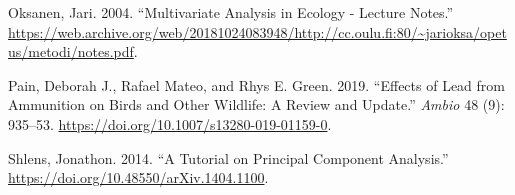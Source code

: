 \documentclass[
  letterpaper,
  DIV=11,
  numbers=noendperiod]{scrreprt}
\newlength{\cslhangindent}
\newenvironment{CSLReferences}[2] %
 {\begin{list}{}{%
  \setlength{\itemindent}{0pt}
  \setlength{\leftmargin}{0pt}
  \setlength{\parsep}{0pt}
  \ifodd #1
   \setlength{\leftmargin}{\cslhangindent}
   \setlength{\itemindent}{-1\cslhangindent}
  \fi
  \setlength{\itemsep}{#2\baselineskip}}}
 {\end{list}}
\begin{document}
\begin{CSLReferences}{1}{0}
Oksanen, Jari. 2004. {``Multivariate Analysis in Ecology - Lecture
Notes.''}
\url{https://web.archive.org/web/20181024083948/http://cc.oulu.fi:80/~jarioksa/opetus/metodi/notes.pdf}.

Pain, Deborah J., Rafael Mateo, and Rhys E. Green. 2019. {``Effects of
Lead from Ammunition on Birds and Other Wildlife: A Review and
Update.''} \emph{Ambio} 48 (9): 935--53.
\url{https://doi.org/10.1007/s13280-019-01159-0}.

Shlens, Jonathon. 2014. {``A Tutorial on Principal Component
Analysis.''} \url{https://doi.org/10.48550/arXiv.1404.1100}.

\end{CSLReferences}
\end{document}
